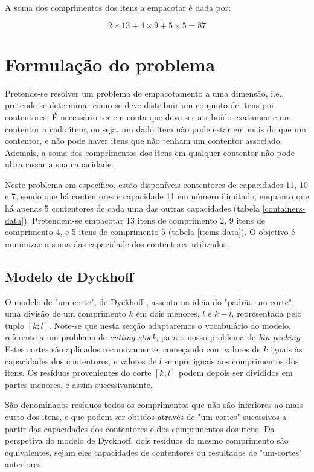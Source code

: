 \documentclass[12pt, a4paper, titlepage]{article}
\begin{document}
A soma dos comprimentos dos itens a empacotar é dada por:

\begin{equation}
    2 \times 13 + 4 \times 9 + 5 \times 5 = 87
    \label{eq:items-sum}
\end{equation}

\section{Formulação do problema}

Pretende-se resolver um problema de empacotamento a uma dimensão, i.e., pretende-se determinar como
se deve distribuir um conjunto de itens por contentores. É necessário ter em conta que deve ser
atribuído exatamente um contentor a cada item, ou seja, um dado item não pode estar em mais do que
um contentor, e não pode haver itens que não tenham um contentor associado. Ademais, a soma dos
comprimentos dos itens em qualquer contentor não pode ultrapassar a sua capacidade.

Neste problema em específico, estão disponíveis contentores de capacidades 11, 10 e 7, sendo que há
contentores e capacidade 11 em número ilimitado, enquanto que há apenas 5 contentores de cada uma
das outras capacidades (tabela \ref{containers-data}). Pretendem-se empacotar 13 itens de
comprimento 2, 9 itens de comprimento 4, e 5 itens de comprimento 5 (tabela \ref{items-data}). O
objetivo é minimizar a soma das capacidade dos contentores utilizados.

\subsection{Modelo de Dyckhoff}

O modelo de "um-corte"{}, de Dyckhoff \cite{dyckhoff}, assenta na ideia do "padrão-um-corte", uma
divisão de um comprimento $k$ em dois menores, $l$ e $k - l$, representada pelo tuplo $[k; l]$.
Note-se que nesta secção adaptaremos o vocabulário do modelo, referente a um problema de
\emph{cutting stock}, para o nosso problema de \emph{bin packing}. Estes cortes são aplicados
recursivamente, começando com valores de $k$ iguais às capacidades dos contentores, e valores de $l$
sempre iguais aos comprimentos dos itens. Os resíduos provenientes do corte $[k; l]$ podem depois
ser divididos em partes menores, e assim sucessivamente.

São denominados resíduos todos os comprimentos que não são inferiores ao mais curto dos itens, e
que podem ser obtidos através de "um-cortes"{} sucessivos a partir das capacidades dos contentores e
dos comprimentos dos itens. Da perspetiva do modelo de Dyckhoff, dois resíduos do mesmo comprimento
são equivalentes, sejam eles capacidades de contentores ou resultados de "um-cortes"{} anteriores.
\end{document}
